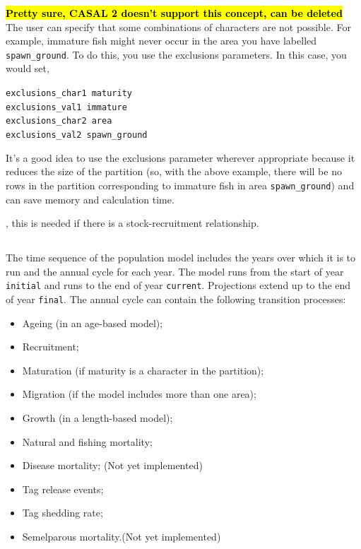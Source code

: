 \hl{\textbf{Pretty sure, CASAL 2 doesn't support this concept, can be deleted}}\\
The user can specify that some combinations of characters are not possible. For example, immature fish might never occur in the area you have labelled \texttt{spawn\_ground}. To do this, you use the exclusions parameters. In this case, you would set,

\texttt{exclusions\_char1 maturity}\\
\texttt{exclusions\_val1 immature}\\
\texttt{exclusions\_char2 area}\\
\texttt{exclusions\_val2 spawn\_ground}

It’s a good idea to use the exclusions parameter wherever appropriate because it reduces the size of the partition (so, with the above example, there will be no rows in the partition corresponding to immature fish in area \texttt{spawn\_ground}) and can save memory and calculation time.

 , this is needed if there is a stock-recruitment relationship. 

\subsection{}

The time sequence of the population model includes the years over which it is to run and the annual cycle for each year. The model runs from the start of year \texttt{initial} and runs to the end of year \texttt{current}. Projections extend up to the end of year \texttt{final}. The annual cycle can contain the following transition processes: 

\begin{itemize}
\item	Ageing (in an age-based model);
\item	Recruitment;
\item	Maturation (if maturity is a character in the partition);
\item	Migration (if the model includes more than one area);
\item	Growth (in a length-based model);
\item	Natural and fishing mortality;
\item	Disease mortality; (Not yet implemented)
\item	Tag release events;
\item	Tag shedding rate;
\item	Semelparous mortality.(Not yet implemented)
\end{itemize}

